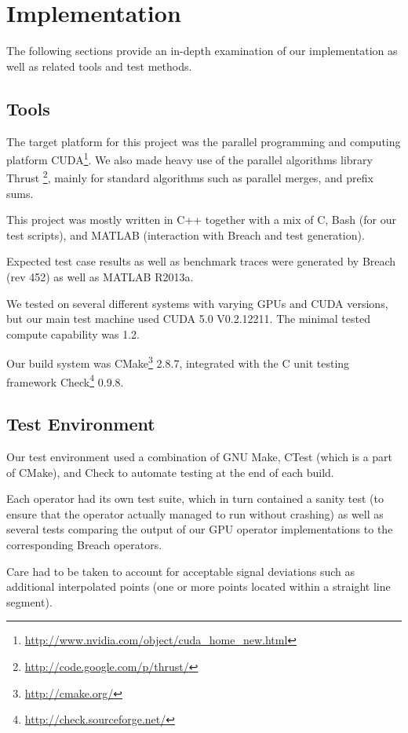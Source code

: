 \documentclass[a4paper,10pt]{article}
\begin{document}
\section{Implementation}

The following sections provide an in-depth examination of our implementation
as well as related tools and test methods.

\subsection{Tools}

The target platform for this project was the parallel programming and computing platform CUDA\footnote{\url{http://www.nvidia.com/object/cuda_home_new.html}}.
We also made heavy use of the parallel algorithms library Thrust \footnote{\url{http://code.google.com/p/thrust/}}, mainly for standard algorithms such as parallel merges, and prefix sums.

This project was mostly written in C++ together with a mix of C, Bash (for our test scripts), and MATLAB (interaction with Breach and test generation).

Expected test case results as well as benchmark traces were generated by Breach (rev 452) as well as MATLAB R2013a.

We tested on several different systems with varying GPUs and CUDA versions, but
our main test machine used CUDA 5.0 V0.2.12211. The minimal tested compute capability
was 1.2.

Our build system was CMake\footnote{\url{http://cmake.org/}} 2.8.7, integrated with the
C unit testing framework Check\footnote{\url{http://check.sourceforge.net/}} 0.9.8.

\subsection{Test Environment}

Our test environment used a combination of GNU Make, CTest (which is a part of CMake), and Check to automate testing at the end of each build.

Each operator had its own test suite, which in turn contained a sanity test (to ensure that the operator actually managed to run without crashing) as well as
several tests comparing the output of our GPU operator implementations to the
corresponding Breach operators.

Care had to be taken to account for acceptable signal deviations such as additional
interpolated points (one or more points located within a straight line segment).
\end{document}
